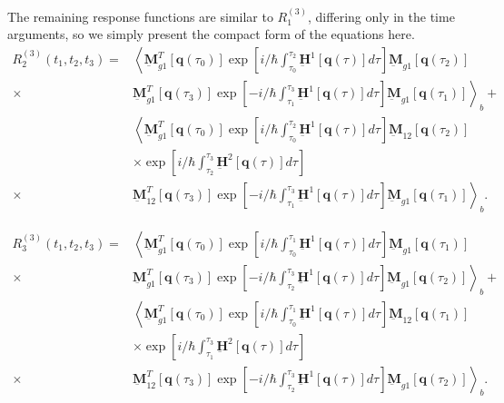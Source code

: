 \documentclass{article}
\newcommand{\vect}[1]{\ensuremath{\boldsymbol{\mathbf{#1}}}}
\begin{document}
The remaining response functions are similar to $R_{1}^{(3)}$, differing only in the time arguments, so we simply present the compact form of the equations here.
\begin{equation}
\begin{split}
 R_{2}^{(3)}(t_{1},t_{2},t_{3})=&\left\langle\underbar{\vect{M}}_{g1}^{T}[\vect q(\tau_{0})]\exp\left[i/\hbar\int_{\tau_{0}}^{\tau_{2}}\underbar{\vect{H}}^{1}[\vect q(\tau)]d\tau\right] \underbar{\vect{M}}_{g1} [\vect q(\tau_{2})]\right.\\
			  \times&\left.\underbar{\vect{M}}_{g1}^{T}[\vect q(\tau_{3})]\exp\left[-i/\hbar\int_{\tau_{1}}^{\tau_{3}}\underbar{\vect{H}}^{1}[\vect q(\tau)]d\tau\right] \underbar{\vect{M}}_{g1} [\vect q(\tau_{1})]\right\rangle_{b}+\\
			  &\left\langle\underbar{\vect{M}}_{g1}^{T}[\vect q(\tau_{0})]\exp\left[i/\hbar\int_{\tau_{0}}^{\tau_{2}}\underbar{\vect{H}}^{1}[\vect q(\tau)]d\tau\right] \underbar{\vect{M}}_{12} [\vect q(\tau_{2})]\right.\\
			  &\times\exp\left[i/\hbar\int_{\tau_{2}}^{\tau_{3}}\underbar{\vect{H}}^{2}[\vect q(\tau)]d\tau\right]\\
			  \times&\left.\underbar{\vect{M}}_{12}^{T}[\vect q(\tau_{3})]\exp\left[-i/\hbar\int_{\tau_{1}}^{\tau_{3}}\underbar{\vect{H}}^{1}[\vect q(\tau)]d\tau\right] \underbar{\vect{M}}_{g1} [\vect q(\tau_{1})]\right\rangle_{b}.
\end{split}
\end{equation}

\begin{equation}
\begin{split}
 R_{3}^{(3)}(t_{1},t_{2},t_{3})=&\left\langle\underbar{\vect{M}}_{g1}^{T}[\vect q(\tau_{0})]\exp\left[i/\hbar\int_{\tau_{0}}^{\tau_{1}}\underbar{\vect{H}}^{1}[\vect q(\tau)]d\tau\right] \underbar{\vect{M}}_{g1} [\vect q(\tau_{1})]\right.\\
			  \times&\left.\underbar{\vect{M}}_{g1}^{T}[\vect q(\tau_{3})]\exp\left[-i/\hbar\int_{\tau_{2}}^{\tau_{3}}\underbar{\vect{H}}^{1}[\vect q(\tau)]d\tau\right] \underbar{\vect{M}}_{g1} [\vect q(\tau_{2})]\right\rangle_{b}+\\
			  &\left\langle\underbar{\vect{M}}_{g1}^{T}[\vect q(\tau_{0})]\exp\left[i/\hbar\int_{\tau_{0}}^{\tau_{1}}\underbar{\vect{H}}^{1}[\vect q(\tau)]d\tau\right] \underbar{\vect{M}}_{12} [\vect q(\tau_{1})]\right.\\
			  &\times\exp\left[i/\hbar\int_{\tau_{1}}^{\tau_{3}}\underbar{\vect{H}}^{2}[\vect q(\tau)]d\tau\right]\\
			  \times&\left.\underbar{\vect{M}}_{12}^{T}[\vect q(\tau_{3})]\exp\left[-i/\hbar\int_{\tau_{2}}^{\tau_{3}}\underbar{\vect{H}}^{1}[\vect q(\tau)]d\tau\right] \underbar{\vect{M}}_{g1} [\vect q(\tau_{2})]\right\rangle_{b}.
\end{split}
\end{equation}
\end{document}
